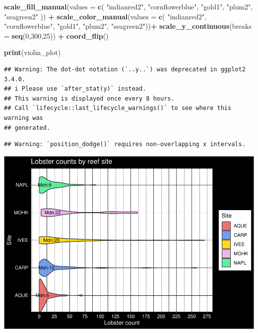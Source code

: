 \documentclass[
]{article}
\newenvironment{Shaded}{\begin{snugshade}}{\end{snugshade}}
\newcommand{\AttributeTok}[1]{\textcolor[rgb]{0.13,0.29,0.53}{#1}}
\newcommand{\DecValTok}[1]{\textcolor[rgb]{0.00,0.00,0.81}{#1}}
\newcommand{\FunctionTok}[1]{\textcolor[rgb]{0.13,0.29,0.53}{\textbf{#1}}}
\newcommand{\NormalTok}[1]{#1}
\newcommand{\SpecialCharTok}[1]{\textcolor[rgb]{0.81,0.36,0.00}{\textbf{#1}}}
\newcommand{\StringTok}[1]{\textcolor[rgb]{0.31,0.60,0.02}{#1}}
\begin{document}
\begin{Shaded}
\begin{Highlighting}[]
  \FunctionTok{scale\_fill\_manual}\NormalTok{(}\AttributeTok{values =} \FunctionTok{c}\NormalTok{(}
    \StringTok{"indianred2"}\NormalTok{, }\StringTok{"cornflowerblue"}\NormalTok{, }\StringTok{"gold1"}\NormalTok{, }\StringTok{"plum2"}\NormalTok{, }\StringTok{"seagreen2"}
\NormalTok{  )) }\SpecialCharTok{+}
  \FunctionTok{scale\_color\_manual}\NormalTok{(}\AttributeTok{values =} \FunctionTok{c}\NormalTok{(}
    \StringTok{"indianred2"}\NormalTok{, }\StringTok{"cornflowerblue"}\NormalTok{, }\StringTok{"gold1"}\NormalTok{, }\StringTok{"plum2"}\NormalTok{, }\StringTok{"seagreen2"}\NormalTok{))}\SpecialCharTok{+}
  \FunctionTok{scale\_y\_continuous}\NormalTok{(}\AttributeTok{breaks =} \FunctionTok{seq}\NormalTok{(}\DecValTok{0}\NormalTok{,}\DecValTok{300}\NormalTok{,}\DecValTok{25}\NormalTok{)) }\SpecialCharTok{+}
  \FunctionTok{coord\_flip}\NormalTok{() }
  

\FunctionTok{print}\NormalTok{(violin\_plot)}
\end{Highlighting}
\end{Shaded}

\begin{verbatim}
## Warning: The dot-dot notation (`..y..`) was deprecated in ggplot2 3.4.0.
## i Please use `after_stat(y)` instead.
## This warning is displayed once every 8 hours.
## Call `lifecycle::last_lifecycle_warnings()` to see where this warning was
## generated.
\end{verbatim}

\begin{verbatim}
## Warning: `position_dodge()` requires non-overlapping x intervals.
\end{verbatim}

\includegraphics{hw1-lobstrs-eds241_files/figure-latex/unnamed-chunk-10-1.pdf}
\end{document}
